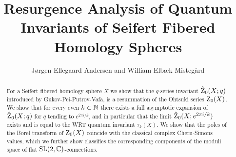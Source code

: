 \title{Resurgence Analysis of Quantum Invariants of Seifert Fibered Homology Spheres}%


\author{Jørgen Ellegaard Andersen and William Elbæk Mistegård   %
}




\maketitle 


%
%      
%
%      




\begin{abstract}
	For a Seifert fibered homology sphere $X$ we show that the $q$-series invariant  $\hat{\operatorname{Z}}_0(X;q)$ introduced by Gukov-Pei-Putrov-Vafa, is a  resummation of the Ohtsuki series $\operatorname{Z}_0(X)$. We show that for every even $k \in \mathbb{N}$ there exists a full asymptotic expansion of $ \hat{\operatorname{Z}}_0(X;q) $ for $q$ tending to $e^{2\pi i/k}$, and in particular that the limit $\hat{\operatorname{Z}}_0(X;e^{2\pi i/k})$ exists and is equal to the  WRT  quantum invariant $\tau_k(X)$. We show that the poles of the Borel transform of $\operatorname{Z}_0(X)$ coincide with the classical complex Chern-Simons values, which we further show classifies the corresponding  components of the moduli space of flat $\rm{SL}(2,\mathbb{C})$-connections. 
	\end{abstract}

\pagestyle{myheadings}

